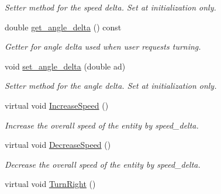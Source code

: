\begin{DoxyCompactItemize}
\begin{DoxyCompactList}\small\item\em Setter method for the speed delta. Set at initialization only. \end{DoxyCompactList}\item 
double \hyperlink{class_motion_handler_a67c945d11edc741af5c71c3596ead557}{get\+\_\+angle\+\_\+delta} () const \hypertarget{class_motion_handler_a67c945d11edc741af5c71c3596ead557}{}\label{class_motion_handler_a67c945d11edc741af5c71c3596ead557}

\begin{DoxyCompactList}\small\item\em Getter for angle delta used when user requests turning. \end{DoxyCompactList}\item 
void \hyperlink{class_motion_handler_a8c2811ddf1a0f077fec829c460009286}{set\+\_\+angle\+\_\+delta} (double ad)\hypertarget{class_motion_handler_a8c2811ddf1a0f077fec829c460009286}{}\label{class_motion_handler_a8c2811ddf1a0f077fec829c460009286}

\begin{DoxyCompactList}\small\item\em Setter method for the angle delta. Set at initialization only. \end{DoxyCompactList}\item 
virtual void \hyperlink{class_motion_handler_af6b91f5626075b09dba3d14177213622}{Increase\+Speed} ()\hypertarget{class_motion_handler_af6b91f5626075b09dba3d14177213622}{}\label{class_motion_handler_af6b91f5626075b09dba3d14177213622}

\begin{DoxyCompactList}\small\item\em Increase the overall speed of the entity by speed\+\_\+delta. \end{DoxyCompactList}\item 
virtual void \hyperlink{class_motion_handler_a25ad77fb1a4c79f8303a256b7e1cbc9c}{Decrease\+Speed} ()\hypertarget{class_motion_handler_a25ad77fb1a4c79f8303a256b7e1cbc9c}{}\label{class_motion_handler_a25ad77fb1a4c79f8303a256b7e1cbc9c}

\begin{DoxyCompactList}\small\item\em Decrease the overall speed of the entity by speed\+\_\+delta. \end{DoxyCompactList}\item 
virtual void \hyperlink{class_motion_handler_a22b99a21307a534165d811740d8aeac1}{Turn\+Right} ()\hypertarget{class_motion_handler_a22b99a21307a534165d811740d8aeac1}{}\label{class_motion_handler_a22b99a21307a534165d811740d8aeac1}


\end{DoxyCompactItemize}
